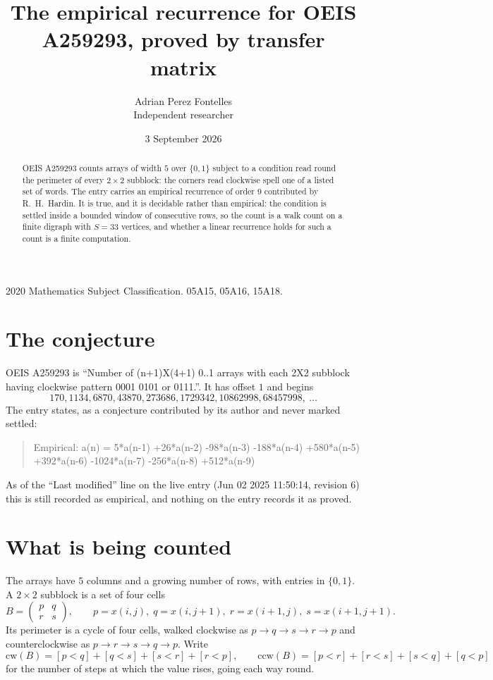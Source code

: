 \documentclass[11pt,a4paper]{article}
\title{The empirical recurrence for OEIS A259293, proved by transfer matrix}
\author{Adrian Perez Fontelles\\ \small Independent researcher}
\date{3 September 2026}
\theoremstyle{plain}
\theoremstyle{definition}
\begin{document}
\maketitle

\begin{abstract}
OEIS A259293 counts arrays of width $5$ over $\{0,1\}$ subject to a condition read round the
perimeter of every $2\times2$ subblock: the corners read clockwise spell one of a listed set of words. The entry carries an empirical recurrence of
order $9$ contributed by R.~H.~Hardin. It is true, and it is decidable rather than
empirical: the condition is settled inside a bounded window of consecutive rows, so the
count is a walk count on a finite digraph with $S=33$ vertices, and whether a linear
recurrence holds for such a count is a finite computation.
\end{abstract}

\noindent\small 2020 Mathematics Subject Classification. 05A15, 05A16, 15A18.\normalsize

\section{The conjecture}

OEIS A259293 is ``Number of (n+1)X(4+1) 0..1 arrays with each 2X2 subblock having clockwise pattern 0001 0101 or 0111.''. It has offset $1$ and begins
\[
170, 1134, 6870, 43870, 273686, 1729342, 10862998, 68457998,\ \dots
\]
The entry states, as a conjecture contributed by its author and never marked settled:
\begin{quote}
Empirical: a(n) = 5*a(n-1) +26*a(n-2) -98*a(n-3) -188*a(n-4) +580*a(n-5) +392*a(n-6) -1024*a(n-7) -256*a(n-8) +512*a(n-9)
\end{quote}
As of the ``Last modified'' line on the live entry (Jun 02 2025 11:50:14, revision 6) this is still
recorded as empirical, and nothing on the entry records it as proved.

\section{What is being counted}

The arrays have $5$ columns and a growing number of rows, with entries in $\{0,1\}$. A
$2\times2$ subblock is a set of four cells
\[
B=\begin{pmatrix} p & q \\ r & s \end{pmatrix},
\qquad p=x(i,j),\; q=x(i,j+1),\; r=x(i+1,j),\; s=x(i+1,j+1).
\]
Its perimeter is a cycle of four cells, walked clockwise as $p\to q\to s\to r\to p$ and
counterclockwise as $p\to r\to s\to q\to p$. Write
\[
\mathrm{cw}(B)=[p<q]+[q<s]+[s<r]+[r<p],\qquad
\mathrm{ccw}(B)=[p<r]+[r<s]+[s<q]+[q<p]
\]
for the number of steps at which the value rises, going each way round.
\end{document}

